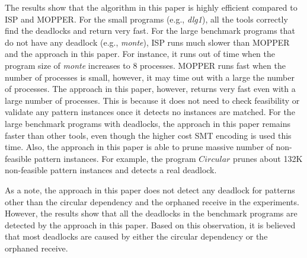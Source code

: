 The results show that the algorithm in this paper is highly efficient compared to ISP and MOPPER. For the small programs (e.g., \textit{dlg1}), all the tools correctly find the deadlocks and return very fast. For the large benchmark programs that do not have any deadlock (e.g., \textit{monte}), ISP runs much slower than MOPPER and the approach in this paper. For instance, it runs out of time when the program size of \textit{monte} increases to 8 processes. MOPPER runs fast when the number of processes is small, however, it may time out with a large the number of processes. The approach in this paper, however, returns very fast even with a large number of processes. This is because it  does not need to check feasibility or validate any pattern instances once it detects no instances are matched. 
For the large benchmark programs with deadlocks, the approach in this paper remains faster than other tools, even though the higher cost SMT encoding is used this time. 
Also, the approach in this paper is able to prune massive number of non-feasible pattern instances. For example, the program $\mathit{Circular}$ prunes about 132K non-feasible pattern instances and detects a real deadlock. 

As a note, the approach in this paper does not detect any deadlock for patterns other than the circular dependency and the orphaned receive in the experiments. 
However, the results show that all the deadlocks in the benchmark programs are detected by the approach in this paper. Based on this observation, it is believed that most deadlocks are caused by either the circular dependency or the orphaned receive.   
